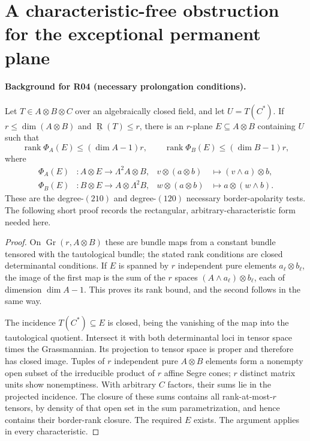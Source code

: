 \section{A characteristic-free obstruction for the exceptional permanent plane}
\label{sec:permanent-apolar}

\paragraph{Background for R04 (necessary prolongation conditions).}
Let $T\in A\otimes B\otimes C$ over an algebraically closed field,
and let $U=T(C^*)$. If $r\leq\dim(A\otimes B)$ and
$\underline{\operatorname R}(T)\leq r$, there is an $r$-plane
$E\subseteq A\otimes B$ containing $U$ such that
\[
 \operatorname{rank}\Phi_A(E)\leq(\dim A-1)r,\qquad
 \operatorname{rank}\Phi_B(E)\leq(\dim B-1)r,
\]
where
\begin{align*}
 \Phi_A(E)&:A\otimes E\longrightarrow\Lambda^2A\otimes B,
 &v\otimes(a\otimes b)&\longmapsto(v\wedge a)\otimes b,\\
 \Phi_B(E)&:B\otimes E\longrightarrow A\otimes\Lambda^2B,
 &w\otimes(a\otimes b)&\longmapsto a\otimes(w\wedge b).
\end{align*}
These are the degree-$(210)$ and degree-$(120)$ necessary
border-apolarity tests. The following short proof records the
rectangular, arbitrary-characteristic form needed here.

\begin{proof}
On $\operatorname{Gr}(r,A\otimes B)$ these are bundle maps
from a constant bundle tensored with the tautological bundle;
the stated rank conditions are closed determinantal conditions.
If $E$ is spanned by $r$ independent pure elements
$a_\ell\otimes b_\ell$, the image of the first map is the sum
of the $r$ spaces $(A\wedge a_\ell)\otimes b_\ell$, each of
dimension $\dim A-1$. This proves its rank bound, and the
second follows in the same way.

The incidence $T(C^*)\subseteq E$ is closed, being the
vanishing of the map into the tautological quotient. Intersect
it with both determinantal loci in tensor space times the
Grassmannian. Its projection to tensor space is proper and
therefore has closed image. Tuples of $r$ independent pure
$A\otimes B$ elements form a nonempty open subset of the
irreducible product of $r$ affine Segre cones; $r$ distinct
matrix units show nonemptiness. With arbitrary $C$ factors,
their sums lie in the projected incidence. The closure of
these sums contains all rank-at-most-$r$ tensors, by density
of that open set in the sum parametrization, and hence
contains their border-rank closure. The required $E$ exists.
The argument applies in every characteristic.
\end{proof}


